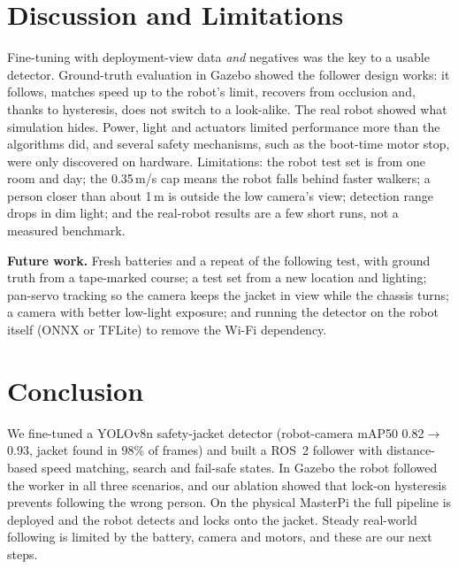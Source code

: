\documentclass[10pt]{article}
\begin{document}
\section{Discussion and Limitations}
Fine-tuning with deployment-view data \emph{and} negatives was the key to a usable detector. Ground-truth evaluation in Gazebo showed the follower design works: it follows, matches speed up to the robot's limit, recovers from occlusion and, thanks to hysteresis, does not switch to a look-alike. The real robot showed what simulation hides. Power, light and actuators limited performance more than the algorithms did, and several safety mechanisms, such as the boot-time motor stop, were only discovered on hardware. Limitations: the robot test set is from one room and day; the 0.35\,m/s cap means the robot falls behind faster walkers; a person closer than about 1\,m is outside the low camera's view; detection range drops in dim light; and the real-robot results are a few short runs, not a measured benchmark.

\textbf{Future work.} Fresh batteries and a repeat of the following test, with ground truth from a tape-marked course; a test set from a new location and lighting; pan-servo tracking so the camera keeps the jacket in view while the chassis turns; a camera with better low-light exposure; and running the detector on the robot itself (ONNX or TFLite) to remove the Wi-Fi dependency.

\section{Conclusion}
We fine-tuned a YOLOv8n safety-jacket detector (robot-camera mAP50 0.82$\rightarrow$0.93, jacket found in 98\% of frames) and built a ROS~2 follower with distance-based speed matching, search and fail-safe states. In Gazebo the robot followed the worker in all three scenarios, and our ablation showed that lock-on hysteresis prevents following the wrong person. On the physical MasterPi the full pipeline is deployed and the robot detects and locks onto the jacket. Steady real-world following is limited by the battery, camera and motors, and these are our next steps.

\end{document}
